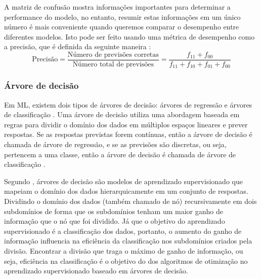 A matriz de confusão mostra informações importantes para determinar a
performance do modelo, no entanto, resumir estas informações em um único número
é mais conveniente quando queremos comparar o desempenho entre  diferentes
modelos. Isto pode ser feito usando uma métrica de desempenho como a precisão,
que é definida da seguinte maneira \cite{tan2009introduccao}:
\[
  \text{Precisão} =
  \frac
    {\text{Número de previsões corretas}}
    {\text{Número total de previsões}} =
  \frac
    {f_{11} + f_{00}}
    {f_{11} + f_{10} + f_{01} + f_{00}}
\]

\subsubsection{Árvore de decisão}

Em ML, existem dois tipos de árvores de decisão: árvores de regressão e árvores
de classificação . Uma
árvore de decisão utiliza uma abordagem baseada em regras para dividir o domínio
dos dados em múltiplos espaços lineares e prever respostas. Se as respostas
previstas forem contínuas, então a árvore de decisão é chamada de árvore de
regressão, e se as previsões são discretas, ou seja, pertencem a uma classe,
então a árvore de decisão é chamada de árvore de classificação
\cite{suthaharan2016machine}.

Segundo , árvores de decisão são modelos de
aprendizado supervisionado que mapeiam o domínio dos dados hierarquicamente em
um conjunto de respostas. Dividindo o domínio dos dados (também chamado de nó)
recursivamente em dois subdomínios de forma que os subdomínios tenham um maior
ganho de informação que o nó que foi dividido. Já que o objetivo do aprendizado
supervisionado é a classificação dos dados, portanto,  o aumento do ganho de
informação influencia na eficiência da classificação nos subdomínios criados
pela divisão. Encontrar a divisão que traga o máximo de ganho de informação, ou
seja, eficiência na classificação é o objetivo do dos algoritmos de otimização
no aprendizado supervisionado baseado em árvores de decisão.


